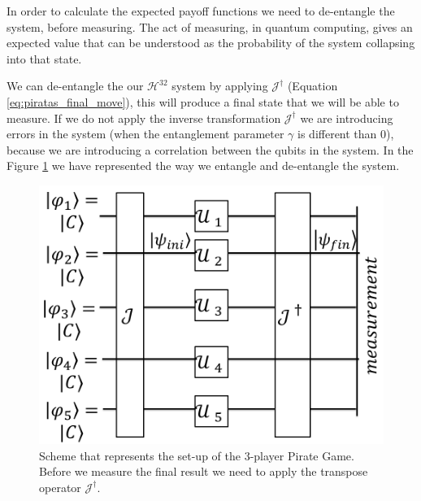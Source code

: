 In order to calculate the expected payoff functions we need to de-entangle the system, before measuring. The act of measuring, in quantum computing, gives an expected value that can be understood as the probability of the system collapsing into that state. 

We can de-entangle the our $\mathcal{H}^{32}$ system by applying $\mathcal{J}^{\dagger}$ (Equation \ref{eq:piratas_final_move}), this will produce a final state that we will be able to measure. If we do not apply the inverse transformation $\mathcal{J}^{\dagger}$ we are introducing errors in the system (when the entanglement parameter $\gamma$ is different than $0$), because we are introducing a correlation between the qubits in the system. In the Figure \ref{fig:pg_architecture3players} we have represented the way we entangle and de-entangle the system.


\begin{figure}[h]
\centering 
\includegraphics[scale=0.35]{Figures/architecture/esquema/esquema.png}
\caption{Scheme that represents the set-up of the $3$-player Pirate Game. Before we measure the final result we need to apply the transpose operator $\mathcal{J}^{\dagger}$. }
\label{fig:pg_architecture3players}
\end{figure}



